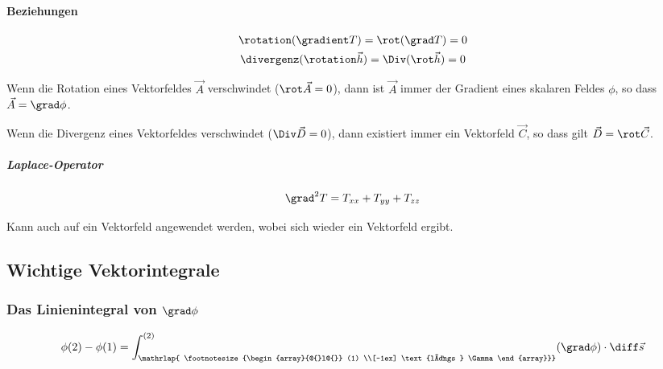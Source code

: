 			\paragraph{Beziehungen} %
				\begin{gather*}
					\rotation(\gradient T) = \rot (\grad T) = 0 \\
					\divergenz(\rotation \vec{h}) = \Div (\rot \vec{h}) = 0
				\end{gather*}
				
				\begin{theorem}
					Wenn die Rotation eines Vektorfeldes $\vec{A}$ verschwindet ($\rot \vec{A} = 0$), dann ist $\vec{A}$ immer der Gradient eines skalaren Feldes $\phi$, so dass $\vec{A} = \grad \phi$.
				\end{theorem}
				
				\begin{theorem}
					Wenn die Divergenz eines Vektorfeldes verschwindet ($\Div \vec{D} = 0$), dann existiert immer ein Vektorfeld $\vec{C}$, so dass gilt $\vec{D} = \rot \vec{C}$.
				\end{theorem}
				
				\subparagraph{Laplace-Operator} %
					
					\[
						\grad^2 T = T_{xx} + T_{yy} + T_{zz}
					\]
					
					Kann auch auf ein Vektorfeld angewendet werden, wobei sich wieder ein Vektorfeld ergibt.
					
			
		
	
	\subsection{Wichtige Vektorintegrale} %
		
		\subsubsection{Das Linienintegral von $\grad \phi$} %
			
			\[
				\phi(2) - \phi(1) = \int_{\mathrlap{
					\footnotesize{\begin{array}{@{}l@{}}
						(1) \\[-1ex]
						\text{längs } \Gamma
					\end{array}}}
				}^{(2)} (\grad \phi) \cdot \diff \vec{s}
			\]
			
